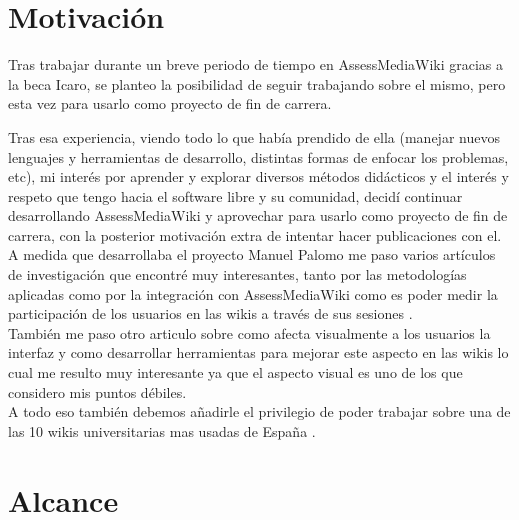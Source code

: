 

\section{Motivación}
Tras trabajar durante un breve periodo de tiempo en AssessMediaWiki gracias a la beca Icaro, se planteo la posibilidad de seguir trabajando sobre el mismo, pero esta vez para usarlo como proyecto de fin de carrera.
\newline

Tras esa experiencia, viendo todo lo que había prendido de ella (manejar nuevos lenguajes y herramientas de desarrollo, distintas formas de enfocar los problemas, etc), mi interés por aprender y explorar diversos métodos didácticos y el interés y respeto que tengo hacia el software libre y su comunidad, decidí continuar desarrollando AssessMediaWiki y aprovechar para usarlo como proyecto de fin de carrera, con la posterior motivación extra de intentar hacer publicaciones con el.\\

A medida que desarrollaba el proyecto Manuel Palomo me paso varios artículos de investigación que encontré muy interesantes, tanto por las metodologías aplicadas como por la integración con AssessMediaWiki como es poder medir la participación de los usuarios en las wikis a través de sus sesiones \cite{Stuart} .\\

También me paso otro articulo sobre como afecta visualmente a los usuarios la interfaz y como desarrollar herramientas para mejorar este aspecto en las wikis \cite{Mohamad} lo cual me resulto muy interesante ya que el aspecto visual es uno de los que considero mis puntos débiles.\\

A todo eso también debemos añadirle el privilegio de poder trabajar sobre una de las 10 wikis universitarias mas usadas de España \cite{Ortega} .\\

\section{Alcance} 


